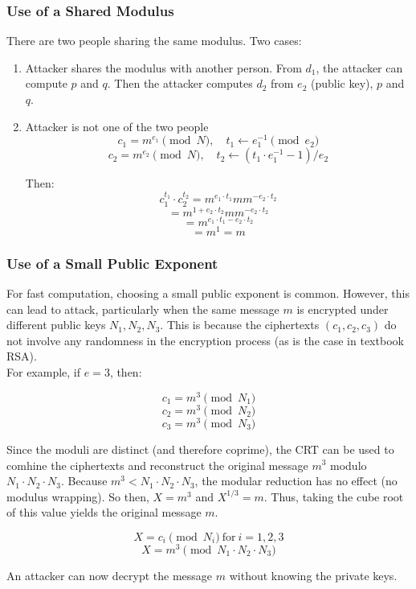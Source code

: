 \subsubsection{Use of a Shared Modulus}
There are two people sharing the same modulus. Two cases:
\begin{enumerate}
    \item Attacker shares the modulus with another person. From $d_1$, the attacker can compute $p$ and $q$. Then the attacker computes $d_2$ from $e_2$ (public key), $p$ and $q$.
    \item Attacker is not one of the two people
    \[ c_1 = m^{e_1} \pmod{N} , \quad t_1 \leftarrow e_1^{-1} \pmod{e_2}\]
    \[ c_2 = m^{e_2} \pmod{N} , \quad t_2 \leftarrow (t_1 \cdot e_1^{-1} -1) / e_2\]
    
    Then:
    \[ c_1^{t_1} \cdot c_2^{t_2} = m^{e_1 \cdot t_1}mm^{-e_2 \cdot t_2} \]
    \[ = m^{1 + e_2 \cdot t_2}mm^{-e_2 \cdot t_2} \]
    \[ = m^{e_1 \cdot t_1 -e_2 \cdot t_2} \]
    \[ = m^1 = m\]
\end{enumerate}

\subsubsection{Use of a Small Public Exponent}
For fast computation, choosing a small public exponent is common.
However, this can lead to attack, particularly when the same message $m$ 
is encrypted under different public keys $N_1, N_2, N_3$.
This is because the ciphertexts $(c_1, c_2, c_3)$ do not involve any randomness in the encryption process (as is the case in textbook RSA). \\

For example, if $e = 3$, then:

\[ c_1 = m^3 \pmod{N_1} \]
\[ c_2 = m^3 \pmod{N_2} \]
\[ c_3 = m^3 \pmod{N_3} \]

Since the moduli are distinct (and therefore coprime), the CRT can be used to comhine the ciphertexts 
and reconstruct the original message $m^3$ modulo $N_1 \cdot N_2 \cdot N_3$. 
Because $m^3 < N_1 \cdot N_2 \cdot N_3$, the modular reduction has no effect (no modulus wrapping).
So then, $X= m^3$ and $X^{1/3} = m$.
Thus, taking the cube root of this value yields the original message $m$.

\[ X = c_i \pmod{N_i} \  \text{for} \ i = 1,2,3 \]
\[ X = m^3 \pmod{N_1 \cdot N_2 \cdot N_3} \]

An attacker can now decrypt the message $m$ without knowing the private keys. \\

